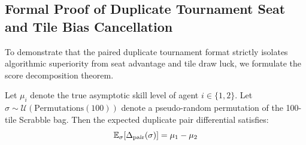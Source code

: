 \subsection{Formal Proof of Duplicate Tournament Seat and Tile Bias Cancellation}
\label{app:proof_duplicate}

To demonstrate that the paired duplicate tournament format strictly isolates algorithmic superiority from seat advantage and tile draw luck, we formulate the score decomposition theorem.

\begin{theorem}
\label{thm:duplicate_cancellation}
Let $\mu_i$ denote the true asymptotic skill level of agent $i \in \{1, 2\}$. Let $\sigma \sim \mathcal{U}(\mathrm{Permutations}(100))$ denote a pseudo-random permutation of the 100-tile Scrabble bag. Then the expected duplicate pair differential satisfies:
\begin{equation}
    \mathbb{E}_\sigma [\Delta_{\mathrm{pair}}(\sigma)] = \mu_1 - \mu_2
\end{equation}
\end{theorem}

